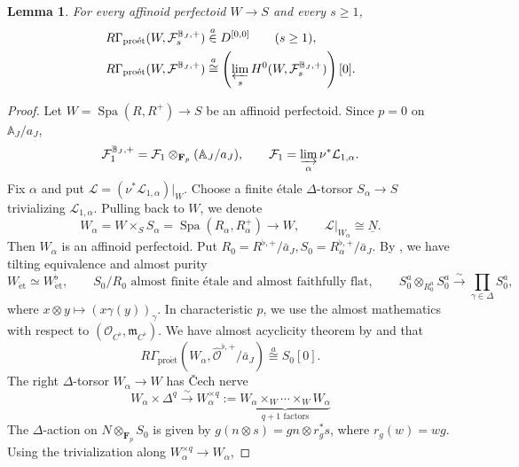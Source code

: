 \documentclass[11pt]{article}
\newtheorem{lemma}[theorem]{Lemma}
\theoremstyle{definition}
\newcommand{\cO}{\mathcal O}
\newcommand{\proet}{\mathrm{pro\acute et}}
\newcommand{\et}{\mathrm{\acute et}}
\newcommand{\acong}{\mathrel{\overset{a}{\cong}}}
\newcommand{\ain}{\mathrel{\overset{a}{\in}}}
\begin{document}
\begin{lemma}
\label{lem:period-integral-perfectoid}
For every affinoid perfectoid \(W\to S\) and every \(s\geq1\),
\begin{equation}\label{eq:period-perfectoid-torsion-vanishing}
 \begin{aligned}
 R\Gamma_{\proet}(W,\mathcal F_s^{\mathbb B_J,+})
 &\ain D^{[0,0]}\qquad(s\geq1),\\
 R\Gamma_{\proet}(W,\mathcal F^{\mathbb B_J,+})
 &\acong
 \left(\varprojlim_s
 H^0(W,\mathcal F_s^{\mathbb B_J,+})\right)[0].
 \end{aligned}
\end{equation}
\end{lemma}

\begin{proof}
Let $W=\operatorname{Spa}(R,R^+)\to S$ be an affinoid perfectoid.
Since $p=0$ on $\mathbb A_J/a_J$,
\[
 \mathcal F_1^{\mathbb B_J,+}
 =\mathcal F_1\otimes_{\mathbf F_p}
                 (\mathbb A_J/a_J),\qquad
 \mathcal F_1
 =\varinjlim_\alpha\nu^*\mathcal L_{1,\alpha}.
\]
Fix \(\alpha\) and put
\(\mathcal L=(\nu^*\mathcal L_{1,\alpha})|_W\).
Choose a finite
\'etale \(\Delta\)-torsor \(S_\alpha\to S\) trivializing
\(\mathcal L_{1,\alpha}\).  Pulling back to $W$, we denote
\[
 W_\alpha=W\times_SS_\alpha=\operatorname{Spa}(R_\alpha,R^+_\alpha)
 \longrightarrow W,\qquad
 \mathcal L|_{W_\alpha}\cong\underline N.
\]
Then \(W_\alpha\) is an affinoid perfectoid.  Put
\(
 R_0=R^{\flat,+}/\bar{a}_J,
 S_0=R^{\flat,+}_\alpha/\bar{a}_J.\) By \cite[Theorems~7.9 and~7.12]{ScholzePerfectoid}
, we have tilting equivalence and almost purity 
\[
 W_{\et}\simeq W^\flat_{\et},\qquad
 S_0/R_0\text{ almost finite \'etale and almost faithfully flat},
 \qquad
 S_0^a\otimes_{R_0^a}S_0^a
 \xrightarrow{\sim}\prod_{\gamma\in\Delta}S_0^a,
\]
where $x\otimes y\mapsto(x\gamma(y))_\gamma$.
In characteristic $p$, we use the almost mathematics with respect to
$(\cO_{C^\flat},\mathfrak m_{C^\flat})$.
We have almost acyclicity theorem by \cite[Proposition~7.13]{ScholzePerfectoid} and
\cite[Proposition~3.12 and Lemma~4.10]{ScholzeRigid} that
\[
 R\Gamma_{\proet}
 (W_\alpha,\widehat{\mathscr O}^{\flat,+}/\bar{a}_J)
 \acong S_0[0].
\]
The right $\Delta$-torsor $W_\alpha\to W$ has \v Cech nerve
\[
 W_\alpha\times\Delta^q\xrightarrow{\sim}
 W_\alpha^{\times q}:=\underbrace{W_\alpha\times_W\cdots\times_W W_\alpha}_{q+1\text{ factors}}
\]
The $\Delta$-action on $N\otimes_{\mathbf F_p}S_0$ is given by
$g(n\otimes s)=gn\otimes r_g^*s$, where $r_g(w)=wg$.
Using the trivialization along $W_\alpha^{\times q}\to W_\alpha$, 

\end{proof}
\end{document}
